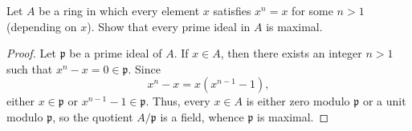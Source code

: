 \begin{exercise}
Let \(A\) be a ring in which every element \(x\) satisfies \(x^n = x\) for some \(n > 1\) (depending on \(x\)).
Show that every prime ideal in \(A\) is maximal.
\end{exercise}

\begin{proof}
Let \(\mathfrak p\) be a prime ideal of \(A\).
If \(x \in A\), then there exists an integer \(n > 1\) such that \(x^n - x = 0 \in \mathfrak p\).
Since
\begin{equation*}
x^n - x = x(x^{n-1} - 1),
\end{equation*}
either \(x\in\mathfrak p\) or \(x^{n-1} - 1 \in \mathfrak p\).
Thus, every \(x \in A\) is either zero modulo \(\mathfrak p\) or a unit modulo \(\mathfrak p\), so the quotient \(A/\mathfrak p\) is a field, whence \(\mathfrak p\) is maximal.
\end{proof}